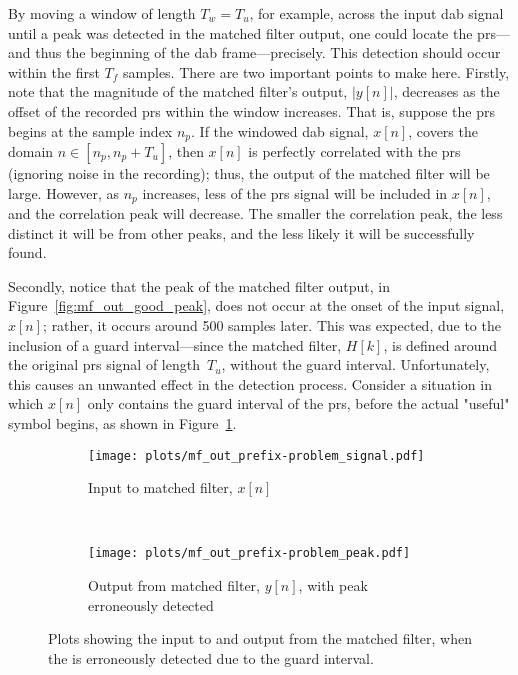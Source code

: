 \documentclass[class=report,11pt,crop=false]{standalone}
\begin{document}
By moving a window of length \(T_w = T_u\), for example, across the input \gls{dab} signal until a peak was detected in the matched filter output, one could locate the \gls{prs}---and thus the beginning of the \gls{dab} frame---precisely. This detection should occur within the first \(T_f\) samples. There are two important points to make here. Firstly, note that the magnitude of the matched filter's output, \(|y[n]|\), decreases as the offset of the recorded \gls{prs} within the window increases. That is, suppose the \gls{prs} begins at the sample index \(n_p\). If the windowed \gls{dab} signal, \(x[n]\), covers the domain \(n \in [n_p, n_p + T_u]\), then \(x[n]\) is perfectly correlated with the \gls{prs} (ignoring noise in the recording); thus, the output of the matched filter will be large. However, as \(n_p\) increases, less of the \gls{prs} signal will be included in \(x[n]\), and the correlation peak will decrease. The smaller the correlation peak, the less distinct it will be from other peaks, and the less likely it will be successfully found.

Secondly, notice that the peak of the matched filter output, in Figure~\ref{fig:mf_out_good_peak}, does not occur at the onset of the input signal, \(x[n]\); rather, it occurs around 500 samples later. This was expected, due to the inclusion of a guard interval---since the matched filter, \(H[k]\), is defined around the original \gls{prs} signal of length~\(T_u\), without the guard interval. Unfortunately, this causes an unwanted effect in the detection process. Consider a situation in which \(x[n]\) only contains the guard interval of the \gls{prs}, before the actual "useful" symbol begins, as shown in Figure~\ref{fig:mf_out_prefix-problem_signal}.

\begin{figure}[htbp]
  \centering
  \captionsetup{type=figure}
  \begin{subfigure}[t]{\textwidth}
    \centering
    \captionsetup{type=figure}
    \texttt{[image: plots/mf\_out\_prefix-problem\_signal.pdf]}
    \caption{Input to matched filter, \(x[n]\)}
    \label{fig:mf_out_prefix-problem_signal}
  \end{subfigure}%
  \\
  \begin{subfigure}[t]{\textwidth}
    \centering
    \captionsetup{type=figure}
    \texttt{[image: plots/mf\_out\_prefix-problem\_peak.pdf]}
    \caption{Output from matched filter, \(y[n]\), with peak erroneously detected}
    \label{fig:mf_out_prefix-problem_peak}
  \end{subfigure}
  \caption{Plots showing the input to and output from the matched filter, when the  is erroneously detected due to the guard interval.}
  \label{fig:mf_out_prefix-problem}
\end{figure}
\end{document}
